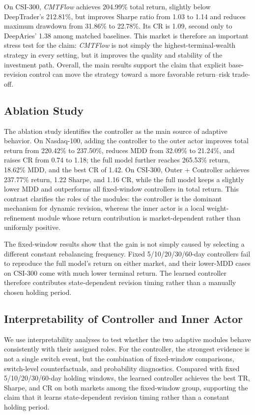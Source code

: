 \documentclass[letterpaper]{article} %
\begin{document}
On CSI-300, \textit{CMTFlow} achieves 204.99\% total return, slightly below DeepTrader's 212.81\%, but improves Sharpe ratio from 1.03 to 1.14 and reduces maximum drawdown from 31.86\% to 22.78\%. Its CR is 1.09, second only to DeepAries' 1.38 among matched baselines. This market is therefore an important stress test for the claim: \textit{CMTFlow} is not simply the highest-terminal-wealth strategy in every setting, but it improves the quality and stability of the investment path. Overall, the main results support the claim that explicit base-revision control can move the strategy toward a more favorable return--risk trade-off.

\subsection{Ablation Study}

The ablation study identifies the controller as the main source of adaptive behavior. On Nasdaq-100, adding the controller to the outer actor improves total return from 220.42\% to 237.50\%, reduces MDD from 32.09\% to 21.24\%, and raises CR from 0.74 to 1.18; the full model further reaches 265.53\% return, 18.62\% MDD, and the best CR of 1.42. On CSI-300, Outer + Controller achieves 237.77\% return, 1.22 Sharpe, and 1.16 CR, while the full model keeps a slightly lower MDD and outperforms all fixed-window controllers in total return. This contrast clarifies the roles of the modules: the controller is the dominant mechanism for dynamic revision, whereas the inner actor is a local weight-refinement module whose return contribution is market-dependent rather than uniformly positive.

The fixed-window results show that the gain is not simply caused by selecting a different constant rebalancing frequency. Fixed 5/10/20/30/60-day controllers fail to reproduce the full model's return on either market, and their lower-MDD cases on CSI-300 come with much lower terminal return. The learned controller therefore contributes state-dependent revision timing rather than a manually chosen holding period.

\subsection{Interpretability of Controller and Inner Actor}

We use interpretability analyses to test whether the two adaptive modules behave consistently with their assigned roles. For the controller, the strongest evidence is not a single switch event, but the combination of fixed-window comparisons, switch-level counterfactuals, and probability diagnostics. Compared with fixed 5/10/20/30/60-day holding windows, the learned controller achieves the best TR, Sharpe, and CR on both markets among the fixed-window group, supporting the claim that it learns state-dependent revision timing rather than a constant holding period.
\end{document}
